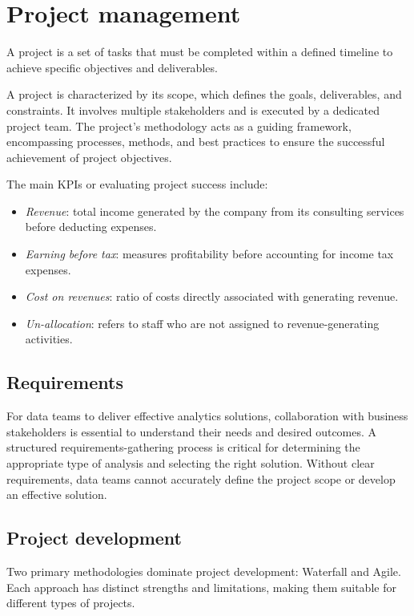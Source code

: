 \section{Project management}

\begin{definition}
    A project is a set of tasks that must be completed within a defined timeline to achieve specific objectives and deliverables.
\end{definition}
\noindent A project is characterized by its scope, which defines the goals, deliverables, and constraints. 
It involves multiple stakeholders and is executed by a dedicated project team. 
The project's methodology acts as a guiding framework, encompassing processes, methods, and best practices to ensure the successful achievement of project objectives.

The main KPIs or evaluating project success include:
\begin{itemize}
    \item \textit{Revenue}: total income generated by the company from its consulting services before deducting expenses.
    \item \textit{Earning before tax}: measures profitability before accounting for income tax expenses.
    \item \textit{Cost on revenues}: ratio of costs directly associated with generating revenue. 
    \item \textit{Un-allocation}: refers to staff who are not assigned to revenue-generating activities.
\end{itemize}

\subsection{Requirements}
For data teams to deliver effective analytics solutions, collaboration with business stakeholders is essential to understand their needs and desired outcomes. 
A structured requirements-gathering process is critical for determining the appropriate type of analysis and selecting the right solution.
Without clear requirements, data teams cannot accurately define the project scope or develop an effective solution.

\subsection{Project development}
Two primary methodologies dominate project development: Waterfall and Agile. 
Each approach has distinct strengths and limitations, making them suitable for different types of projects.


